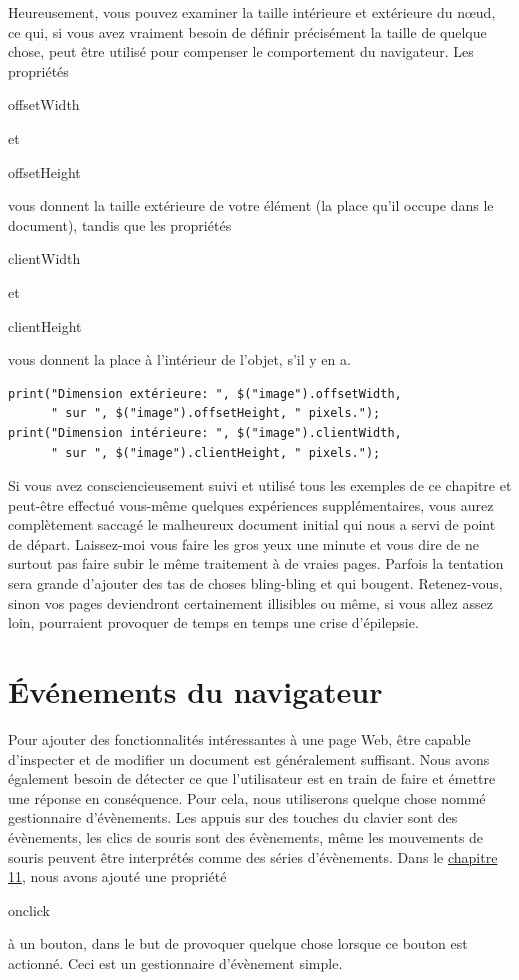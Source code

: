 \documentclass{FramateX}
\renewcommand{\texttt}[1]{\begin{sffamily}{#1}\end{sffamily}}
\begin{document}
Heureusement, vous pouvez examiner la taille intérieure et extérieure du
nœud, ce qui, si vous avez vraiment besoin de définir précisément la
taille de quelque chose, peut être utilisé pour compenser le
comportement du navigateur. Les propriétés \texttt{offsetWidth} et
\texttt{offsetHeight} vous donnent la taille extérieure de votre élément
(la place qu'il occupe dans le document), tandis que les propriétés
\texttt{clientWidth} et \texttt{clientHeight} vous donnent la place à
l'intérieur de l'objet, s'il y en a.

\begin{lstlisting}
print("Dimension extérieure: ", $("image").offsetWidth,
      " sur ", $("image").offsetHeight, " pixels.");
print("Dimension intérieure: ", $("image").clientWidth,
      " sur ", $("image").clientHeight, " pixels.");
\end{lstlisting}
\begin{center}\end{center}

Si vous avez consciencieusement suivi et utilisé tous les exemples de ce
chapitre et peut-être effectué vous-même quelques expériences
supplémentaires, vous aurez complètement saccagé le malheureux document
initial qui nous a servi de point de départ. Laissez-moi vous faire les
gros yeux une minute et vous dire de ne surtout pas faire subir le même
traitement à de vraies pages. Parfois la tentation sera grande d'ajouter
des tas de choses bling-bling et qui bougent. Retenez-vous, sinon vos
pages deviendront certainement illisibles ou même, si vous allez assez
loin, pourraient provoquer de temps en temps une crise d'épilepsie.

\chapter{Événements du navigateur}

Pour ajouter des fonctionnalités intéressantes à une page Web, être
capable d'inspecter et de modifier un document est généralement
suffisant. Nous avons également besoin de détecter ce que l'utilisateur
est en train de faire et émettre une réponse en conséquence. Pour cela,
nous utiliserons quelque chose nommé gestionnaire d'évènements. Les
appuis sur des touches du clavier sont des évènements, les clics de
souris sont des évènements, même les mouvements de souris peuvent être
interprétés comme des séries d'évènements. Dans le
\href{chapter11.html}{chapitre 11}, nous avons ajouté une propriété
\texttt{onclick} à un bouton, dans le but de provoquer quelque chose
lorsque ce bouton est actionné. Ceci est un gestionnaire d'évènement
simple.
\end{document}
